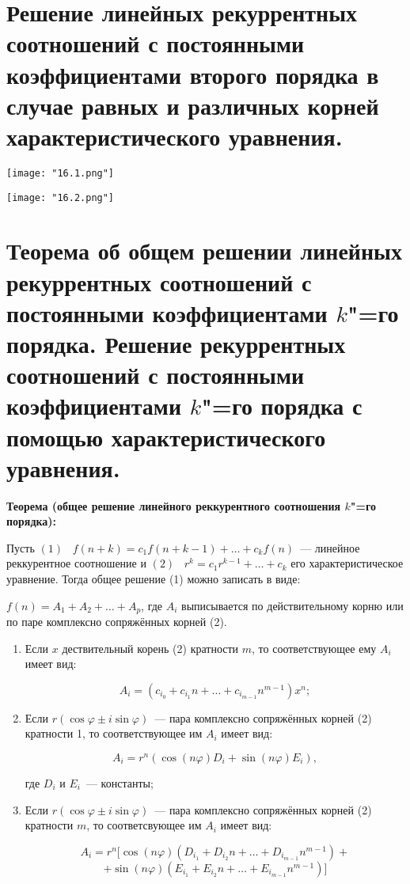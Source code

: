 \section{Решение линейных рекуррентных соотношений с постоянными коэффициентами 
второго порядка в случае равных и различных корней характеристического 
уравнения.}    

\begin{center}
    \texttt{[image: "16.1.png"]}
    \bigskip
    
    \texttt{[image: "16.2.png"]}
\end{center}

\section{Теорема об общем решении линейных рекуррентных соотношений с постоянными 
коэффициентами $k$"=го порядка. Решение рекуррентных соотношений с 
постоянными коэффициентами $k$"=го порядка с помощью характеристического 
уравнения.}

\textbf{Теорема (общее решение линейного реккурентного соотношения $k$"=го
порядка):}
    \smallskip

    Пусть $(1) \;\;\; f(n + k) = c_1 f(n + k - 1) + \dots + c_k f(n)$~--- линейное реккурентное
    соотношение и $(2) \;\;\; r^k = c_1 r^{k - 1} + \dots + c_k$ его характеристическое
    уравнение. Тогда общее решение (1) можно записать в виде:
    \smallskip

    $f(n) = A_1 + A_2 + \dots + A_p$, где $A_i$ выписывается по действительному
    корню или по паре комплексно сопряжённых корней (2).

    \begin{enumerate}
        \item{Если $x$ дествительный корень (2) кратности $m$, то соответствующее
        ему $A_i$ имеет вид:
        
        \[
            A_i = (c_{i_0} + c_{i_1} n + \dots + c_{i_{m - 1}}n^{m - 1}) x^n;  
        \]}
        \item{Если $r(\cos \varphi \pm i \sin \varphi)$~--- пара комплексно 
        сопряжённых корней (2) кратности 1, то соответствующее им $A_i$ 
        имеет вид:
        
        \[
            A_i = r^n (\cos (n \varphi) D_i + \sin (n \varphi) E_i),  
        \]

        где $D_i$ и $E_i$~--- константы;}
        \item{Если $r(\cos \varphi \pm i \sin \varphi)$~--- пара комплексно
        сопряжённых корней (2) кратности $m$, то соответсвующее им $A_i$
        имеет вид:
        
        \[
            A_i = r^n [ \cos (n \varphi) (D_{i_1} + D_{i_2}n + \dots +
            D_{i_{m - 1}}n^{m - 1}) + 
        \]
        \[    
            + \sin (n \varphi) (E_{i_1} + E_{i_2}n + \dots +
            E_{i_{m - 1}}n^{m - 1})]  
        \]}
    \end{enumerate}
    \bigskip

